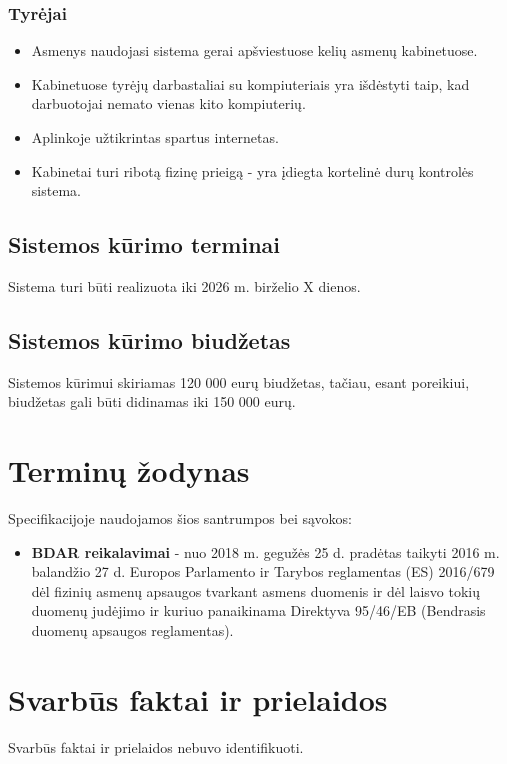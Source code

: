 \documentclass[12pt]{article}
\begin{document}
\subsubsection*{Tyrėjai}
\begin{itemize}
    \item Asmenys naudojasi sistema gerai apšviestuose kelių asmenų
    kabinetuose.
    \item Kabinetuose tyrėjų darbastaliai su kompiuteriais yra išdėstyti taip,
    kad darbuotojai nemato vienas kito kompiuterių.
    \item Aplinkoje užtikrintas spartus internetas.
    \item Kabinetai turi ribotą fizinę prieigą - yra įdiegta kortelinė durų
    kontrolės sistema.
\end{itemize}

\subsection{Sistemos kūrimo terminai}
Sistema turi būti realizuota iki 2026 m. birželio X dienos.

\subsection{Sistemos kūrimo biudžetas}
Sistemos kūrimui skiriamas 120 000 eurų biudžetas, tačiau, esant poreikiui,
biudžetas gali būti didinamas iki 150 000 eurų.

\newpage

\section{Terminų žodynas}
Specifikacijoje naudojamos šios santrumpos bei sąvokos:
\begin{itemize}
    \item \textbf{BDAR reikalavimai} - nuo 2018 m. gegužės 25 d. pradėtas
    taikyti 2016 m. balandžio 27 d. Europos Parlamento ir Tarybos reglamentas
    (ES) 2016/679 dėl fizinių asmenų apsaugos tvarkant asmens duomenis ir dėl
    laisvo tokių duomenų judėjimo ir kuriuo panaikinama Direktyva 95/46/EB
    (Bendrasis duomenų apsaugos reglamentas).
\end{itemize}

\newpage

\section{Svarbūs faktai ir prielaidos}
Svarbūs faktai ir prielaidos nebuvo identifikuoti.
\end{document}
